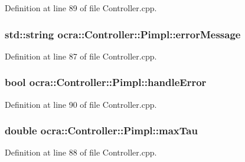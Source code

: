 Definition at line 89 of file Controller.\+cpp.

\subsubsection[{\texorpdfstring{error\+Message}{errorMessage}}]{\setlength{\rightskip}{0pt plus 5cm}std\+::string ocra\+::\+Controller\+::\+Pimpl\+::error\+Message}\hypertarget{structocra_1_1Controller_1_1Pimpl_a1150a44bd413ec025703d53c8eaf4733}{}\label{structocra_1_1Controller_1_1Pimpl_a1150a44bd413ec025703d53c8eaf4733}


Definition at line 87 of file Controller.\+cpp.

\subsubsection[{\texorpdfstring{handle\+Error}{handleError}}]{\setlength{\rightskip}{0pt plus 5cm}bool ocra\+::\+Controller\+::\+Pimpl\+::handle\+Error}\hypertarget{structocra_1_1Controller_1_1Pimpl_a2764f0bf903a983abae8195ab6639ed5}{}\label{structocra_1_1Controller_1_1Pimpl_a2764f0bf903a983abae8195ab6639ed5}


Definition at line 90 of file Controller.\+cpp.

\subsubsection[{\texorpdfstring{max\+Tau}{maxTau}}]{\setlength{\rightskip}{0pt plus 5cm}double ocra\+::\+Controller\+::\+Pimpl\+::max\+Tau}\hypertarget{structocra_1_1Controller_1_1Pimpl_a6731e905858ef90305a3c99c605c8069}{}\label{structocra_1_1Controller_1_1Pimpl_a6731e905858ef90305a3c99c605c8069}


Definition at line 88 of file Controller.\+cpp.


